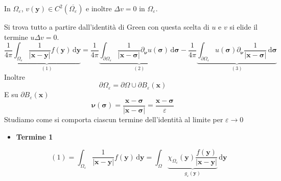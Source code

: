 \documentclass[10pt,a4paper,twoside,openright]{book}
\newcommand{\x}{\mathbf{x}}
\newcommand{\y}{\mathbf{y}}
\newcommand{\sigg}{\bm{\sigma}}
\newcommand{\nuu}{\bm{\nu}}
\newcommand{\de}{\,\mathrm d}
\newcommand{\dyy}{\de \y}
\newcommand{\dsig}{\de \sigg}
\begin{document}
\begin{dimostrazione}
\begin{figure}[H]
	\end{figure}
	\FloatBarrier

	In $\displaystyle \Omega _{\varepsilon }$, $\displaystyle v(\y) \in C^{2}\left(\overline{\Omega _{\varepsilon }}\right)$ e inoltre $\displaystyle \Delta v=0$ in $\displaystyle \Omega _{\varepsilon }$.

	Si trova tutto a partire dall'identità di Green con questa scelta di $u$ e $v$ si elide il termine $\displaystyle u\Delta v=0$.
	\begin{equation*}
	\frac{1}{4\pi }\underbrace{\int _{\Omega _{\varepsilon }}\frac{1}{| \x -\y| } f(\y) \dyy}_{(1)} =\frac{1}{4\pi }\underbrace{\int _{\partial \Omega _{\varepsilon }}\frac{1}{| \x -\sigg| } \partial _{\nuu} u(\sigg) \dsig}_{(2)} -\frac{1}{4\pi }\underbrace{\int _{\partial \Omega _{\varepsilon }} u(\sigg) \partial _{\nuu}\frac{1}{| \x -\sigg| } \dsig}_{(3)}
	\end{equation*}
	Inoltre
	\begin{equation*}
	\partial \Omega _{\varepsilon } =\partial \Omega \cup \partial B_{\varepsilon }(\x)
	\end{equation*}
	E su $\displaystyle \partial B_{\varepsilon }(\x)$
	\begin{equation*}
	\nuu(\sigg) =\frac{\x -\sigg}{| \x -\sigg| } =\frac{\x -\sigg}{\varepsilon }
	\end{equation*}
	Studiamo come si comporta ciascun termine dell'identità al limite per $\displaystyle \varepsilon \rightarrow 0$
	\begin{itemize}
	\item \textbf{Termine 1}

	\begin{equation*}
	(1) =\int _{\Omega _{\varepsilon }}\frac{1}{| \x -\y| } f(\y) \dyy =\int _{\Omega }\underbrace{\chi _{\Omega _{\varepsilon }}(\y)\frac{f(\y)}{| \x -\y| }}_{g_{\varepsilon }(\y)} \dyy
	\end{equation*}


\end{itemize}
\end{dimostrazione}
\end{document}
